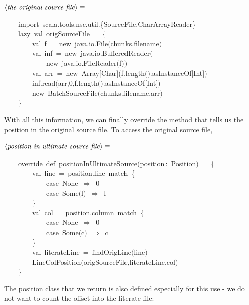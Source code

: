 \documentclass[a4paper,12pt]{article}
\begin{document}
$\left<\mbox{\emph{the original source file}}\right>\equiv$
\begin{program}~~~~{\vem import}~scala.tools.nsc.util.{\small\{}SourceFile,CharArrayReader{\small\}}
\\~~~~{\vem lazy}~{\vem val}~origSourceFile~=~{\small\{}
\\~~~~~~~~{\vem val}~f~=~{\vem new}~java.io.File$($chunks.filename$)$
\\~~~~~~~~{\vem val}~inf~=~{\vem new}~java.io.BufferedReader$($
\\~~~~~~~~~~~~{\vem new}~java.io.FileReader$($f$)$$)$
\\~~~~~~~~{\vem val}~arr~=~{\vem new}~Array$[$Char$]$$($f.length$($$)$.asInstanceOf$[$Int$]$$)$
\\~~~~~~~~inf.read$($arr,0,f.length$($$)$.asInstanceOf$[$Int$]$$)$
\\~~~~~~~~{\vem new}~BatchSourceFile$($chunks.filename,arr$)$
\\~~~~{\small\}}
\\[0.5em]\end{program}
With all this information, we can finally override the method that tells
us the position in the original source file. To access the original source
file, 

$\left<\mbox{\emph{position in ultimate source file}}\right>\equiv$
\begin{program}~~~~{\vem override}~{\vem def}~positionInUltimateSource$($position\,{\rm :}~Position$)$~=~{\small\{}
\\~~~~~~~~{\vem val}~line~=~position.line~{\vem match}~{\small\{}
\\~~~~~~~~~~~~{\vem case}~None~$\Rightarrow$~0
\\~~~~~~~~~~~~{\vem case}~Some$($l$)$~$\Rightarrow$~l
\\~~~~~~~~{\small\}}
\\~~~~~~~~{\vem val}~col~=~position.column~{\vem match}~{\small\{}
\\~~~~~~~~~~~~{\vem case}~None~$\Rightarrow$~0
\\~~~~~~~~~~~~{\vem case}~Some$($c$)$~$\Rightarrow$~c
\\~~~~~~~~{\small\}}
\\~~~~~~~~{\vem val}~literateLine~=~findOrigLine$($line$)$
\\~~~~~~~~LineColPosition$($origSourceFile,literateLine,col$)$
\\~~~~{\small\}}
\\[0.5em]\end{program}
The position class that we return is also defined especially for this
use - we do not want to count the offset into the literate file:
\end{document}
